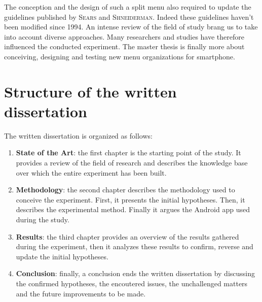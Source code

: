The conception and the design of such a split menu also required to update the 
guidelines published by \textsc{Sears} and \textsc{Shneiderman}. Indeed these 
guidelines haven't been modified since 1994. An intense review of the field of 
study brang us to take into account diverse 
approaches. Many researchers and studies have therefore influenced the conducted 
experiment. The master thesis is finally more about conceiving, designing and 
testing new menu organizations for smartphone.

\section{Structure of the written dissertation}
The written dissertation is organized as follows:

\begin{enumerate}
  \item \textbf{State of the Art}: the first chapter is the starting point of 
the study. It provides a review of the field of research and describes the 
knowledge base over which the entire experiment has been built.
  \item \textbf{Methodology}: the second chapter describes the methodology used 
to conceive the experiment. First, it presents the initial hypotheses. Then, it 
describes the experimental method. Finally it argues the Android app used 
during the study.
  \item \textbf{Results}: the third chapter provides an overview of the results 
gathered during the experiment, then it analyzes these results to 
confirm, reverse and update the initial hypotheses.
  \item \textbf{Conclusion}: finally, a conclusion ends the written 
dissertation by discussing the confirmed hypotheses, the encoutered issues, 
the unchallenged matters and the future improvements to be made.
\end{enumerate}


